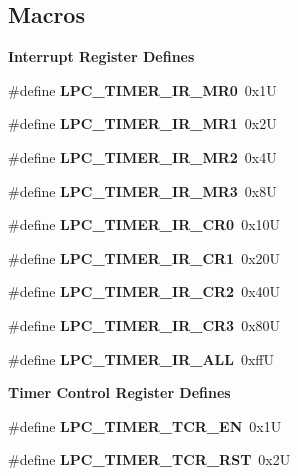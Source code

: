 \subsection*{Macros}
\begin{Indent}\textbf{ Interrupt Register Defines}\par
\begin{DoxyCompactItemize}
\item 
\#define {\bfseries L\+P\+C\+\_\+\+T\+I\+M\+E\+R\+\_\+\+I\+R\+\_\+\+M\+R0}~0x1U
\item 
\#define {\bfseries L\+P\+C\+\_\+\+T\+I\+M\+E\+R\+\_\+\+I\+R\+\_\+\+M\+R1}~0x2U
\item 
\#define {\bfseries L\+P\+C\+\_\+\+T\+I\+M\+E\+R\+\_\+\+I\+R\+\_\+\+M\+R2}~0x4U
\item 
\#define {\bfseries L\+P\+C\+\_\+\+T\+I\+M\+E\+R\+\_\+\+I\+R\+\_\+\+M\+R3}~0x8U
\item 
\#define {\bfseries L\+P\+C\+\_\+\+T\+I\+M\+E\+R\+\_\+\+I\+R\+\_\+\+C\+R0}~0x10U
\item 
\#define {\bfseries L\+P\+C\+\_\+\+T\+I\+M\+E\+R\+\_\+\+I\+R\+\_\+\+C\+R1}~0x20U
\item 
\#define {\bfseries L\+P\+C\+\_\+\+T\+I\+M\+E\+R\+\_\+\+I\+R\+\_\+\+C\+R2}~0x40U
\item 
\#define {\bfseries L\+P\+C\+\_\+\+T\+I\+M\+E\+R\+\_\+\+I\+R\+\_\+\+C\+R3}~0x80U
\item 
\#define {\bfseries L\+P\+C\+\_\+\+T\+I\+M\+E\+R\+\_\+\+I\+R\+\_\+\+A\+LL}~0xffU
\end{DoxyCompactItemize}
\end{Indent}
\begin{Indent}\textbf{ Timer Control Register Defines}\par
\begin{DoxyCompactItemize}
\item 
\#define {\bfseries L\+P\+C\+\_\+\+T\+I\+M\+E\+R\+\_\+\+T\+C\+R\+\_\+\+EN}~0x1U
\item 
\#define {\bfseries L\+P\+C\+\_\+\+T\+I\+M\+E\+R\+\_\+\+T\+C\+R\+\_\+\+R\+ST}~0x2U
\end{DoxyCompactItemize}
\end{Indent}
